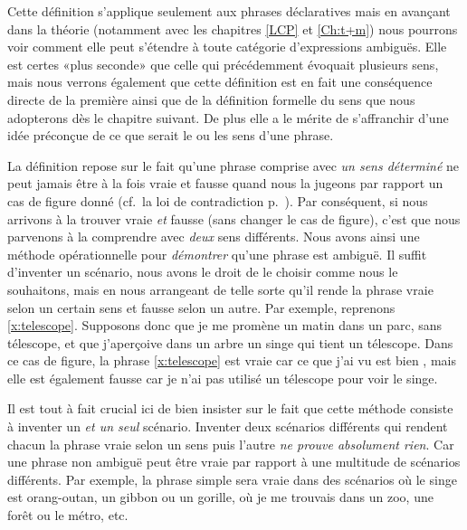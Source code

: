 \begin{refsegment}
Cette définition s'applique seulement aux phrases déclaratives mais en avançant dans la théorie (notamment avec les chapitres \ref{LCP} et \ref{Ch:t+m}) nous pourrons voir comment elle peut s'étendre à toute catégorie d'expressions ambiguës.  
Elle est certes «plus seconde» que celle qui précédemment évoquait plusieurs sens, mais 
nous verrons également que cette définition est en fait une conséquence directe de la première ainsi que de la définition formelle du sens que nous adopterons dès le chapitre suivant.   De plus elle a le mérite de s'affranchir d'une idée préconçue de ce que serait le ou les sens d'une phrase.

La définition repose sur le fait qu'une phrase comprise avec \emph{un sens déterminé} ne peut jamais être à la fois vraie et fausse quand nous la jugeons par rapport un cas de figure donné (cf.\ la loi de contradiction p.~\pageref{loi:contrad}).  
Par conséquent, si nous arrivons à la trouver vraie \emph{et} fausse (sans changer le cas de figure), c'est que nous parvenons à la comprendre avec \emph{deux}  sens différents.
Nous avons ainsi une méthode opérationnelle pour \emph{démontrer} qu'une phrase est ambiguë. 
Il suffit d'inventer un scénario, nous avons le droit de le choisir comme nous le souhaitons, mais en nous arrangeant de telle sorte qu'il rende la phrase vraie selon un certain sens et fausse selon un autre.
Par exemple, reprenons \ref{x:telescope}. 
Supposons donc que je me promène un matin
dans un parc, sans télescope, et que j'aperçoive dans un arbre un singe qui tient un  télescope. Dans ce cas de figure, la phrase \ref{x:telescope} est vraie car ce que j'ai vu est bien , mais elle est également fausse car je n'ai pas utilisé un télescope pour voir le singe.  

Il est tout à fait crucial ici de bien insister sur le fait que cette méthode consiste à inventer un \emph{et un seul} scénario. Inventer deux scénarios différents qui rendent chacun la phrase vraie selon un sens puis l'autre \emph{ne prouve absolument rien}.  Car une phrase non ambiguë peut être vraie par rapport à une multitude de scénarios différents.   Par exemple, la phrase simple  sera vraie dans des scénarios où le singe est orang-outan, un gibbon ou un gorille, où je me trouvais dans un zoo, une forêt ou le métro, etc.  



\end{refsegment}
